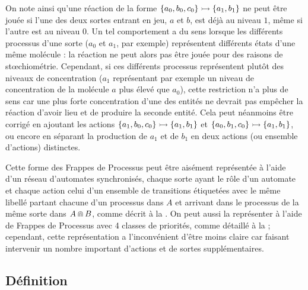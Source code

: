 On note ainsi qu'une réaction de la forme $\mbox{$\{ a_0, b_0, c_0 \} \rightarrowtail \{ a_1, b_1 \}$}$
ne peut être jouée si l'une des deux sortes entrant en jeu, $a$ et $b$, est déjà au niveau $1$,
même si l'autre est au niveau $0$.
Un tel comportement a du sens lorsque les différents processus d'une sorte
($a_0$ et $a_1$, par exemple)
représentent différents états d'une même molécule :
la réaction ne peut alors pas être jouée pour des raisons de stœchiométrie.
Cependant, si ces différents processus représentent plutôt des niveaux de concentration
($a_1$ représentant par exemple un niveau de concentration de la molécule $a$ plus élevé que $a_0$),
cette restriction n'a plus de sens car une plus forte concentration d'une des entités
ne devrait pas empêcher la réaction d'avoir lieu et de produire la seconde entité.
Cela peut néanmoins être corrigé en ajoutant les actions
$\mbox{$\{ a_1, b_0, c_0 \} \rightarrowtail \{ a_1, b_1 \}$}$ et
$\mbox{$\{ a_0, b_1, c_0 \} \rightarrowtail \{ a_1, b_1 \}$}$,
ou encore en séparant la production de $a_1$ et de $b_1$ en deux actions (ou ensemble d'actions)
distinctes.

Cette forme des Frappes de Processus peut être aisément représentée à l'aide d'un réseau
d'automates synchronisés, chaque sorte ayant le rôle d'un automate et chaque action celui d'un
ensemble de transitions étiquetées avec le même libellé partant chacune d'un processus dans $A$ et
arrivant dans le processus de la même sorte dans $A \Cap B$,
comme décrit à la .
On peut aussi la représenter à l'aide de Frappes de Processus avec 4 classes de priorités,
comme détaillé à la  ;
cependant, cette représentation a l'inconvénient d'être moins claire car faisant intervenir
un nombre important d'actions et de sortes supplémentaires.




\subsection{Définition}




